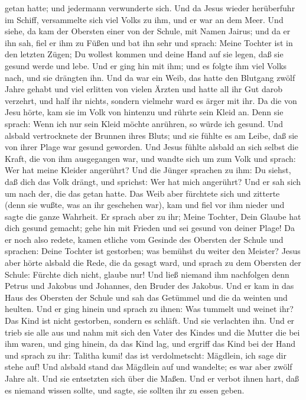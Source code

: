 getan hatte; und jedermann verwunderte sich.  Und da Jesus
wieder herüberfuhr im Schiff, versammelte sich viel Volks zu ihm, und er
war an dem Meer.  Und siehe, da kam der Obersten einer von
der Schule, mit Namen Jairus; und da er ihn sah, fiel er ihm zu Füßen
 und bat ihn sehr und sprach: Meine Tochter ist in den
letzten Zügen; Du wollest kommen und deine Hand auf sie legen, daß sie
gesund werde und lebe.  Und er ging hin mit ihm; und es
folgte ihm viel Volks nach, und sie drängten ihn.  Und da
war ein Weib, das hatte den Blutgang zwölf Jahre gehabt 
und viel erlitten von vielen Ärzten und hatte all ihr Gut darob
verzehrt, und half ihr nichts, sondern vielmehr ward es ärger mit ihr.
 Da die von Jesu hörte, kam sie im Volk von hintenzu und
rührte sein Kleid an.  Denn sie sprach: Wenn ich nur sein
Kleid möchte anrühren, so würde ich gesund.  Und alsbald
vertrocknete der Brunnen ihres Bluts; und sie fühlte es am Leibe, daß
sie von ihrer Plage war gesund geworden.  Und Jesus fühlte
alsbald an sich selbst die Kraft, die von ihm ausgegangen war, und
wandte sich um zum Volk und sprach: Wer hat meine Kleider angerührt?
 Und die Jünger sprachen zu ihm: Du siehst, daß dich das
Volk drängt, und sprichst: Wer hat mich angerührt?  Und er
sah sich um nach der, die das getan hatte.  Das Weib aber
fürchtete sich und zitterte (denn sie wußte, was an ihr geschehen war),
kam und fiel vor ihm nieder und sagte die ganze Wahrheit. 
Er sprach aber zu ihr; Meine Tochter, Dein Glaube hat dich gesund
gemacht; gehe hin mit Frieden und sei gesund von deiner Plage!
 Da er noch also redete, kamen etliche vom Gesinde des
Obersten der Schule und sprachen: Deine Tochter ist gestorben; was
bemühst du weiter den Meister?  Jesus aber hörte alsbald
die Rede, die da gesagt ward, und sprach zu dem Obersten der Schule:
Fürchte dich nicht, glaube nur!  Und ließ niemand ihm
nachfolgen denn Petrus und Jakobus und Johannes, den Bruder des Jakobus.
 Und er kam in das Haus des Obersten der Schule und sah das
Getümmel und die da weinten und heulten.  Und er ging
hinein und sprach zu ihnen: Was tummelt und weinet ihr? Das Kind ist
nicht gestorben, sondern es schläft. Und sie verlachten ihn.
 Und er trieb sie alle aus und nahm mit sich den Vater des
Kindes und die Mutter die bei ihm waren, und ging hinein, da das Kind
lag,  und ergriff das Kind bei der Hand und sprach zu ihr:
Talitha kumi! das ist verdolmetscht: Mägdlein, ich sage dir stehe auf!
 Und alsbald stand das Mägdlein auf und wandelte; es war
aber zwölf Jahre alt. Und sie entsetzten sich über die Maßen.
 Und er verbot ihnen hart, daß es niemand wissen sollte,
und sagte, sie sollten ihr zu essen geben.

